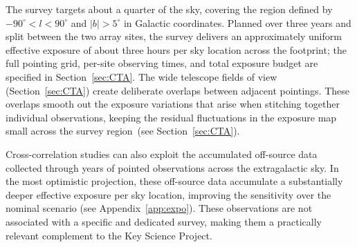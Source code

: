 The \EGAL survey targets about a quarter of the sky, covering the region defined by $-90^\circ < l < 90^\circ$ and $|b| > 5^\circ$ in Galactic coordinates.
Planned over three years and split between the two array sites, the survey delivers an approximately uniform effective exposure of about three hours per sky location across the footprint; the full pointing grid, per-site observing times, and total exposure budget are specified in Section~\ref{sec:CTA}.
The wide telescope fields of view (Section~\ref{sec:CTA}) create deliberate overlaps between adjacent pointings.
These overlaps smooth out the exposure variations that arise when stitching together individual observations, keeping the residual fluctuations in the exposure map small across the survey region~(see Section~\ref{sec:CTA}).


Cross-correlation studies can also exploit the accumulated off-source data collected through years of \CTAO pointed observations across the extragalactic sky.
In the most optimistic projection, these off-source data accumulate a substantially deeper effective exposure per sky location, improving the sensitivity over the nominal \EGAL scenario (see Appendix~\ref{app:expo}).
These observations are not associated with a specific and dedicated survey, making them a practically relevant complement to the \EGAL Key Science Project.

